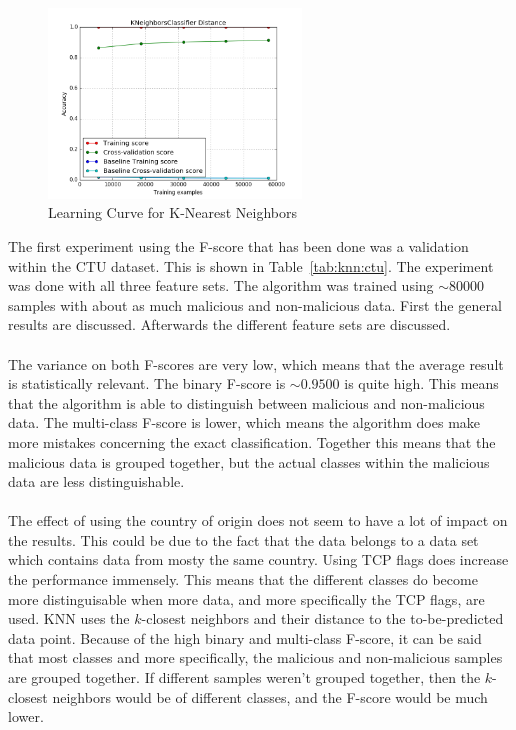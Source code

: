  \begin{figure}[H]
\centering
\includegraphics[width=0.6\textwidth]{Figures/KNeighborsClassifier_Distance}
\decoRule
\caption[Learning Curve for K-Nearest Neighbors]{Learning Curve for K-Nearest Neighbors}
\label{fig:knnlearn1}
\end{figure}

\noindent The first experiment using the F-score that has been done was a validation within the CTU dataset. This is shown in Table~\ref{tab:knn:ctu}. The experiment was done with all three feature sets. The algorithm was trained using $\sim80000$ samples with about as much malicious and non-malicious data. First the general results are discussed. Afterwards the different feature sets are discussed.\\
\\
The variance on both F-scores are very low, which means that the average result is statistically relevant. The binary F-score is $\sim0.9500$ is quite high. This means that the algorithm is able to distinguish between malicious and non-malicious data. The multi-class F-score is lower, which means the algorithm does make more mistakes concerning the exact classification. Together this means that the malicious data is grouped together, but the actual classes within the malicious data are less distinguishable. \\
\\
The effect of using the country of origin does not seem to have a lot of impact on the results. This could be due to the fact that the data belongs to a data set which contains data from mosty the same country. Using TCP flags does increase the performance immensely.  This means that the different classes do become more distinguisable when more data, and more specifically the TCP flags, are used. KNN uses the $k$-closest neighbors and their distance to the to-be-predicted data point. Because of the high binary and multi-class F-score, it can be said that most classes and more specifically, the malicious and non-malicious samples are grouped together. If different samples weren't grouped together, then the $k$-closest neighbors would be of different classes, and the F-score would be much lower.

